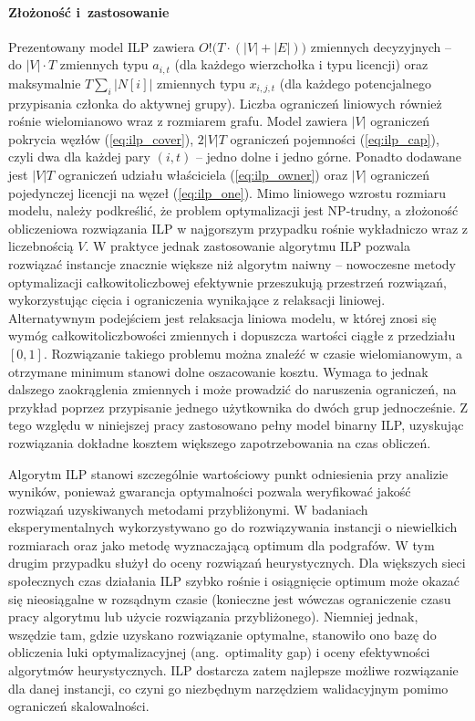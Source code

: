 \paragraph{Złożoność i~zastosowanie}
Prezentowany model ILP zawiera $O!\big(T \cdot (|V| + |E|)\big)$ zmiennych decyzyjnych -- do $|V|\cdot T$ zmiennych typu $a_{i,t}$ (dla każdego wierzchołka i typu licencji) oraz maksymalnie $T \sum_{i}|N[i]|$ zmiennych typu $x_{i,j,t}$ (dla każdego potencjalnego przypisania członka do aktywnej grupy). Liczba ograniczeń liniowych również rośnie wielomianowo wraz z rozmiarem grafu. Model zawiera $|V|$ ograniczeń pokrycia węzłów (\ref{eq:ilp_cover}), $2|V|T$ ograniczeń pojemności (\ref{eq:ilp_cap}), czyli dwa dla każdej pary $(i,t)$ -- jedno dolne i jedno górne. Ponadto dodawane jest $|V|T$ ograniczeń udziału właściciela (\ref{eq:ilp_owner}) oraz $|V|$ ograniczeń pojedynczej licencji na węzeł (\ref{eq:ilp_one}). Mimo liniowego wzrostu rozmiaru modelu, należy podkreślić, że problem optymalizacji jest NP-trudny, a złożoność obliczeniowa rozwiązania ILP w najgorszym przypadku rośnie wykładniczo wraz z liczebnością $V$. W praktyce jednak zastosowanie algorytmu ILP pozwala rozwiązać instancje znacznie większe niż algorytm naiwny -- nowoczesne metody optymalizacji całkowitoliczbowej efektywnie przeszukują przestrzeń rozwiązań, wykorzystując cięcia i ograniczenia wynikające z relaksacji liniowej. Alternatywnym podejściem jest relaksacja liniowa modelu, w której znosi się wymóg całkowitoliczbowości zmiennych i dopuszcza wartości ciągłe z przedziału $[0,1]$. Rozwiązanie takiego problemu można znaleźć w czasie wielomianowym, a otrzymane minimum stanowi dolne oszacowanie kosztu. Wymaga to jednak dalszego zaokrąglenia zmiennych i może prowadzić do naruszenia ograniczeń, na przykład poprzez przypisanie jednego użytkownika do dwóch grup jednocześnie. Z tego względu w niniejszej pracy zastosowano pełny model binarny ILP, uzyskując rozwiązania dokładne kosztem większego zapotrzebowania na czas obliczeń.

Algorytm ILP stanowi szczególnie wartościowy punkt odniesienia przy analizie wyników, ponieważ gwarancja optymalności pozwala weryfikować jakość rozwiązań uzyskiwanych metodami przybliżonymi. W badaniach eksperymentalnych wykorzystywano go do rozwiązywania instancji o niewielkich rozmiarach oraz jako metodę wyznaczającą optimum dla podgrafów. W tym drugim przypadku służył do oceny rozwiązań heurystycznych. Dla większych sieci społecznych czas działania ILP szybko rośnie i osiągnięcie optimum może okazać się nieosiągalne w rozsądnym czasie (konieczne jest wówczas ograniczenie czasu pracy algorytmu lub użycie rozwiązania przybliżonego). Niemniej jednak, wszędzie tam, gdzie uzyskano rozwiązanie optymalne, stanowiło ono bazę do obliczenia luki optymalizacyjnej (ang.~optimality gap) i oceny efektywności algorytmów heurystycznych. ILP dostarcza zatem najlepsze możliwe rozwiązanie dla danej instancji, co czyni go niezbędnym narzędziem walidacyjnym pomimo ograniczeń skalowalności.


